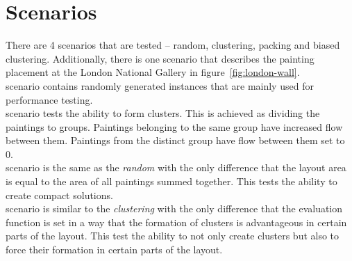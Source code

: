 \section{Scenarios}\label{sec:scenarios}

There are 4 scenarios that are tested – random, clustering, packing and biased clustering.
Additionally, there is one scenario that describes the painting placement at the London National Gallery in figure~\ref{fig:london-wall}. \\

 scenario contains randomly generated instances that are mainly used for performance testing.\\

 scenario tests the ability to form clusters.
This is achieved as dividing the paintings to groups. Paintings belonging to the
same group have increased flow between them. Paintings from the distinct group have flow between
them set to 0. \\

 scenario is the same as the \textit{random} with the only difference that the layout area
is equal to the area of all paintings summed together. This tests the ability to create compact solutions.\\

 scenario is similar to the \textit{clustering} with the only difference
that the evaluation function is set in a way that the formation of clusters is advantageous in certain parts
of the layout. This test the ability to not only create clusters but also to force their formation in certain parts of the layout.\\